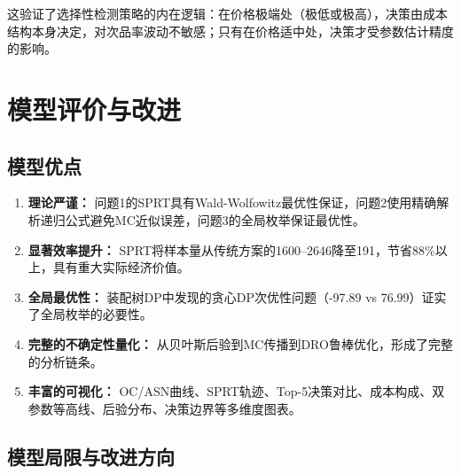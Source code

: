 \documentclass[12pt,a4paper]{ctexart}
\begin{document}
这验证了选择性检测策略的内在逻辑：在价格极端处（极低或极高），决策由成本结构本身决定，对次品率波动不敏感；只有在价格适中处，决策才受参数估计精度的影响。

\section{模型评价与改进}

\subsection{模型优点}

\begin{enumerate}[label=(\arabic*)]
    \item \textbf{理论严谨：} 问题1的SPRT具有Wald-Wolfowitz最优性保证，问题2使用精确解析递归公式避免MC近似误差，问题3的全局枚举保证最优性。
    \item \textbf{显著效率提升：} SPRT将样本量从传统方案的1600--2646降至191，节省88\%以上，具有重大实际经济价值。
    \item \textbf{全局最优性：} 装配树DP中发现的贪心DP次优性问题（-97.89 vs 76.99）证实了全局枚举的必要性。
    \item \textbf{完整的不确定性量化：} 从贝叶斯后验到MC传播到DRO鲁棒优化，形成了完整的分析链条。
    \item \textbf{丰富的可视化：} OC/ASN曲线、SPRT轨迹、Top-5决策对比、成本构成、双参数等高线、后验分布、决策边界等多维度图表。
\end{enumerate}

\subsection{模型局限与改进方向}
\end{document}
